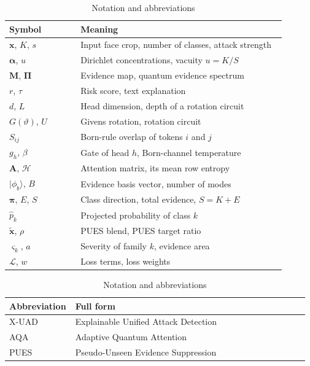 \documentclass[conference]{IEEEtran}
\newcommand{\bs}[1]{\boldsymbol{#1}}
\newcommand{\ket}[1]{\lvert #1 \rangle}
\begin{document}
\begin{table}[t]
\centering
\caption{Notation and abbreviations}
\label{tab:notation}
\scriptsize
\setlength{\tabcolsep}{3pt}
\begin{minipage}[t]{0.49\textwidth}
\centering
\begin{tabular}[t]{@{}p{0.25\linewidth}p{0.72\linewidth}@{}}
\toprule
Symbol & Meaning \\
\midrule
$\bs{x}$, $K$, $s$ & Input face crop, number of classes, attack strength \\
$\bs{\alpha}$, $u$ & Dirichlet concentrations, vacuity $u=K/S$ \\
$\bs{M}$, $\bs{\Pi}$ & Evidence map, quantum evidence spectrum \\
$r$, $\tau$ & Risk score, text explanation \\
$d$, $L$ & Head dimension, depth of a rotation circuit \\
$G(\vartheta)$, $U$ & Givens rotation, rotation circuit \\
$S_{ij}$ & Born-rule overlap of tokens $i$ and $j$ \\
$g_{h}$, $\beta$ & Gate of head $h$, Born-channel temperature \\
$\bs{A}$, $\mathcal{H}$ & Attention matrix, its mean row entropy \\
$\ket{\phi_{b}}$, $B$ & Evidence basis vector, number of modes \\
$\bs{\pi}$, $E$, $S$ & Class direction, total evidence, $S=K+E$ \\
$\hat{p}_{k}$ & Projected probability of class $k$ \\
$\tilde{\bs{x}}$, $\rho$ & PUES blend, PUES target ratio \\
$\varsigma_{k}$, $a$ & Severity of family $k$, evidence area \\
$\mathcal{L}$, $w$ & Loss terms, loss weights \\
\bottomrule
\end{tabular}
\end{minipage}\hfill
\begin{minipage}[t]{0.49\textwidth}
\centering
\begin{tabular}[t]{@{}p{0.20\linewidth}p{0.77\linewidth}@{}}
\toprule
Abbreviation & Full form \\
\midrule
X-UAD & Explainable Unified Attack Detection \\
AQA & Adaptive Quantum Attention \\
PUES & Pseudo-Unseen Evidence Suppression \\

\end{tabular}
\end{minipage}
\end{table}
\end{document}
